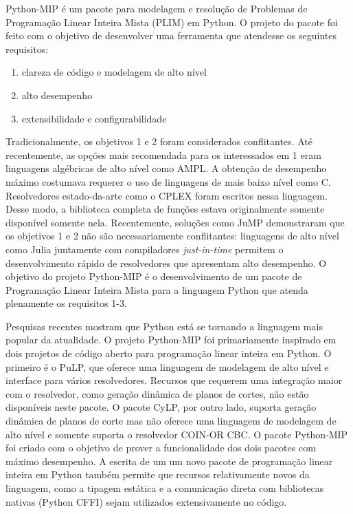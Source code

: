 \documentclass[a4paper,11pt,fleqn]{article}
\begin{document}
Python-MIP é um pacote para modelagem e resolução de Problemas de
Programação Linear Inteira Mista (PLIM)\cite{Wolsey1998} em Python.
O projeto do pacote foi feito com o objetivo de desenvolver uma ferramenta
que atendesse os seguintes requisitos:
\begin{enumerate}
	\item clareza de código e modelagem de alto nível
	\item alto desempenho
	\item extensibilidade e configurabilidade
\end{enumerate}
Tradicionalmente, os objetivos 1 e 2 foram considerados conflitantes.
Até recentemente, as opções mais recomendada para os interessados
em 1 eram linguagens algébricas de alto nível como AMPL\cite{Fourer1987}.
A obtenção de desempenho máximo costumava requerer o uso de linguagens
de mais baixo nível como C\cite{Johnson1991a}. Resolvedores estado-da-arte
como o CPLEX\cite{Bixby2002} foram escritos nessa linguagem. Desse
modo, a biblioteca completa de funções estava originalmente somente
disponível somente nela. Recentemente, soluções como JuMP\cite{Dunning2015}
demonstraram que os objetivos 1 e 2 não são necessariamente conflitantes:
linguagens de alto nível como Julia juntamente com compiladores \emph{just-in-time}
permitem o desenvolvimento rápido de resolvedores que apresentam alto
desempenho. O objetivo do projeto Python-MIP é o desenvolvimento de
um pacote de Programação Linear Inteira Mista para a linguagem Python
que atenda plenamente os requisitos 1-3.

Pesquisas recentes mostram que Python está se tornando a linguagem
mais popular da atualidade\cite{pythonEconomist2018}. O projeto Python-MIP
foi primariamente inspirado em dois projetos de código aberto para
programação linear inteira em Python. O primeiro é o PuLP\cite{Mitchell2009},
que oferece uma linguagem de modelagem de alto nível e interface para
vários resolvedores. Recursos que requerem uma integração maior com
o resolvedor, como geração dinâmica de planos de cortes, não estão
disponíveis neste pacote. O pacote CyLP, por outro lado, suporta geração
dinâmica de planos de corte mas não oferece uma linguagem de modelagem
de alto nível\cite{Towhidi2016} e somente suporta o resolvedor COIN-OR
CBC\cite{Forrest2005}. O pacote Python-MIP foi criado com o objetivo
de prover a funcionalidade dos dois pacotes com máximo desempenho.
A escrita de um um novo pacote de programação linear inteira em Python
também permite que recursos relativamente novos da linguagem, como
a tipagem estática e a comunicação direta com bibliotecas nativas
(Python CFFI) sejam utilizados extensivamente no código.
\end{document}
